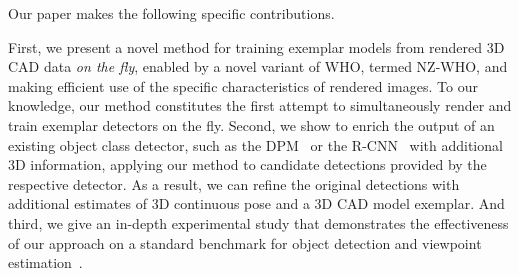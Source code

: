 Our paper makes the following specific contributions.

First, we present a novel method for training exemplar models from
rendered 3D CAD data {\em on the fly}, enabled by a novel variant of
WHO, termed NZ-WHO, and making efficient use of the specific
characteristics of rendered images. To our knowledge, our method
constitutes the first attempt to simultaneously render and train
exemplar detectors on the fly.
%
Second, we show to enrich the output of an existing object class
detector, such as the DPM~\cite{Felzenszwalb10} or the
R-CNN~\cite{Girshick14} with additional 3D information, applying our
method to candidate detections provided by the respective detector. As
a result, we can refine the original detections with additional
estimates of 3D continuous pose and a 3D CAD model exemplar.
%
And third, we give an in-depth experimental study that demonstrates
the effectiveness of our approach on a standard benchmark for
object detection and viewpoint estimation~\cite{Xiang14}. 

